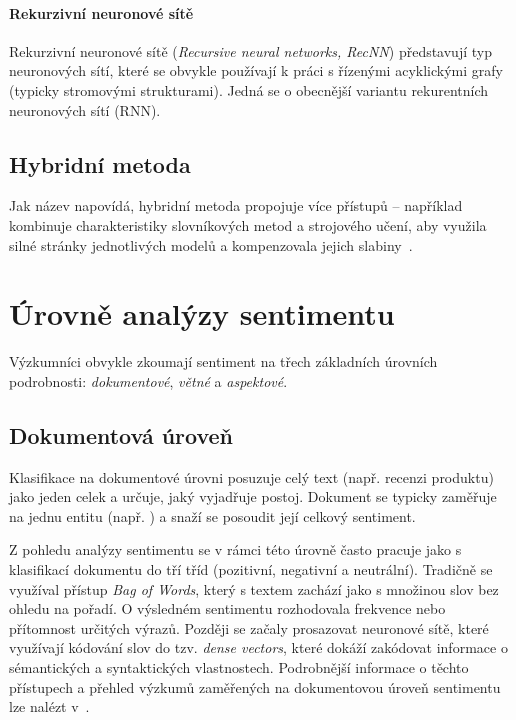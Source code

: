 \paragraph{Rekurzivní neuronové sítě}
Rekurzivní neuronové sítě (\emph{Recursive neural networks, RecNN}) představují typ neuronových sítí, které se obvykle používají k práci s řízenými acyklickými grafy (typicky stromovými strukturami). Jedná se o obecnější variantu rekurentních neuronových sítí (RNN).~\cite{zhang2018deeplearningsentimentanalysis}


\subsection{Hybridní metoda}
Jak název napovídá, hybridní metoda propojuje více přístupů -- například kombinuje charakteristiky slovníkových metod a strojového učení, aby využila silné stránky jednotlivých modelů a kompenzovala jejich slabiny~\cite{Aqlanstudyofsentiment}.

\section{Úrovně analýzy sentimentu}

Výzkumníci obvykle zkoumají sentiment na třech základních úrovních podrobnosti: \emph{dokumentové}, \emph{větné} a \emph{aspektové}.~\cite{MAO2024102048, zhang2018deeplearningsentimentanalysis}

\subsection{Dokumentová úroveň}
Klasifikace na dokumentové úrovni posuzuje celý text (např. recenzi produktu) jako jeden celek a určuje, jaký vyjadřuje postoj. Dokument se typicky zaměřuje na jednu entitu (např. ) a snaží se posoudit její celkový sentiment.~\cite{zhang2018deeplearningsentimentanalysis}

Z pohledu analýzy sentimentu se v rámci této úrovně často pracuje jako s klasifikací dokumentu do tří tříd (pozitivní, negativní a neutrální). Tradičně se využíval přístup \emph{Bag of Words}, který s textem zachází jako s množinou slov bez ohledu na pořadí. O výsledném sentimentu rozhodovala frekvence nebo přítomnost určitých výrazů. Později se začaly prosazovat neuronové sítě, které využívají kódování slov do tzv. \emph{dense vectors}, které dokáží zakódovat informace o sémantických a syntaktických vlastnostech. Podrobnější informace o těchto přístupech a přehled výzkumů zaměřených na dokumentovou úroveň sentimentu lze nalézt v~\cite{zhang2018deeplearningsentimentanalysis}.

